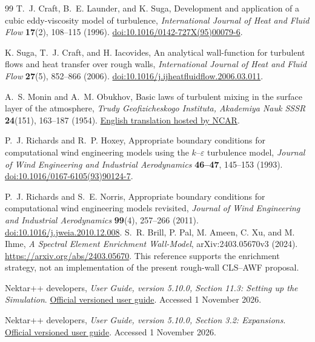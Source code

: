 \documentclass[11pt,a4paper]{article}
\numberwithin{equation}{section}
\newcommand{\eps}{\varepsilon}
\begin{document}
\begin{thebibliography}{99}
T.~J. Craft, B.~E. Launder, and K. Suga,
Development and application of a cubic eddy-viscosity model of turbulence,
\emph{International Journal of Heat and Fluid Flow}
\textbf{17}(2), 108--115 (1996).
\href{https://doi.org/10.1016/0142-727X(95)00079-6}
{doi:10.1016/0142-727X(95)00079-6}.

K. Suga, T.~J. Craft, and H. Iacovides,
An analytical wall-function for turbulent flows and heat transfer over
rough walls,
\emph{International Journal of Heat and Fluid Flow}
\textbf{27}(5), 852--866 (2006).
\href{https://doi.org/10.1016/j.ijheatfluidflow.2006.03.011}
{doi:10.1016/j.ijheatfluidflow.2006.03.011}.

A.~S. Monin and A.~M. Obukhov,
Basic laws of turbulent mixing in the surface layer of the atmosphere,
\emph{Trudy Geofizicheskogo Instituta, Akademiya Nauk SSSR}
\textbf{24}(151), 163--187 (1954).
\href{https://www2.mmm.ucar.edu/wrf/users/physics/phys_refs/SURFACE_LAYER/eta_part1.pdf}
{English translation hosted by NCAR}.

P.~J. Richards and R.~P. Hoxey,
Appropriate boundary conditions for computational wind engineering models
using the $k$--$\eps$ turbulence model,
\emph{Journal of Wind Engineering and Industrial Aerodynamics}
\textbf{46--47}, 145--153 (1993).
\href{https://doi.org/10.1016/0167-6105(93)90124-7}
{doi:10.1016/0167-6105(93)90124-7}.

P.~J. Richards and S.~E. Norris,
Appropriate boundary conditions for computational wind engineering models
revisited,
\emph{Journal of Wind Engineering and Industrial Aerodynamics}
\textbf{99}(4), 257--266 (2011).
\href{https://doi.org/10.1016/j.jweia.2010.12.008}
{doi:10.1016/j.jweia.2010.12.008}.
S.~R. Brill, P. Pal, M. Ameen, C. Xu, and M. Ihme,
\emph{A Spectral Element Enrichment Wall-Model},
arXiv:2403.05670v3 (2024).
\url{https://arxiv.org/abs/2403.05670}.
This reference supports the enrichment strategy, not an implementation
of the present rough-wall CLS--AWF proposal.

Nektar++ developers,
\emph{User Guide, version 5.10.0, Section 11.3:
Setting up the Simulation}.
\href{https://doc.nektar.info/userguide/5.10.0/user-guidese48.html}
{Official versioned user guide}.
Accessed 1 November 2026.

Nektar++ developers,
\emph{User Guide, version 5.10.0, Section 3.2: Expansions}.
\href{https://doc.nektar.info/userguide/5.10.0/user-guidese7.html}
{Official versioned user guide}.
Accessed 1 November 2026.


\end{thebibliography}
\end{document}
